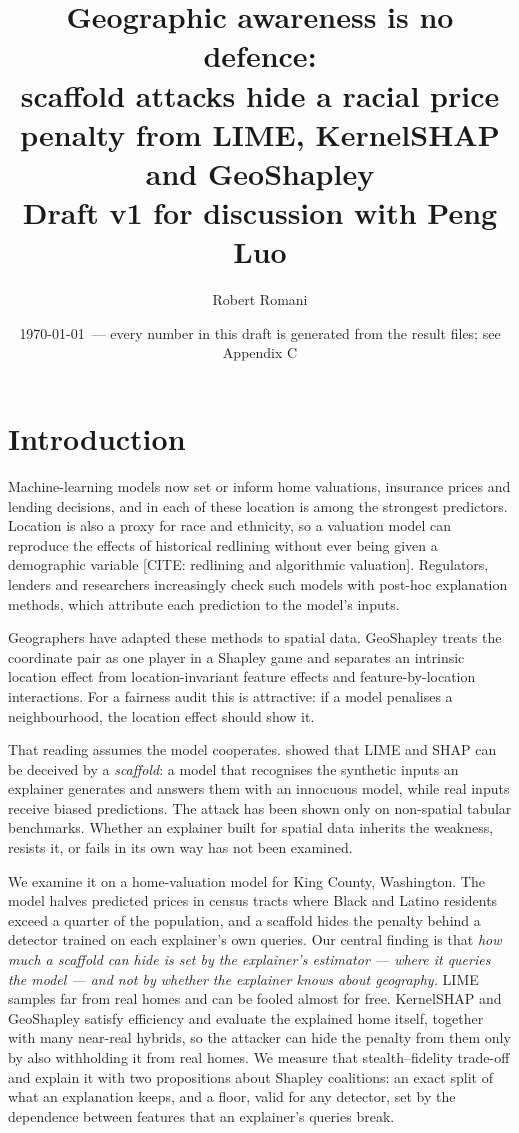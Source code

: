 \documentclass[11pt]{article}
\title{Geographic awareness is no defence:\\ scaffold attacks hide a racial price penalty from LIME, KernelSHAP and GeoShapley\\[6pt]
\large Draft v1 for discussion with Peng Luo}
\author{Robert Romani}
\date{\today\ --- every number in this draft is generated from the result files; see Appendix C}
\newcommand{\1}{\mathbf{1}}
\newcommand{\citeneeded}[1]{\textcolor{blue!60!black}{[CITE: #1]}}
\begin{document}
\maketitle

\begin{abstract}

\end{abstract}

\section{Introduction}

Machine-learning models now set or inform home valuations, insurance prices and lending decisions, and in each of
these location is among the strongest predictors. Location is also a proxy for race and ethnicity, so a valuation
model can reproduce the effects of historical redlining without ever being given a demographic variable
\citeneeded{redlining and algorithmic valuation}. Regulators, lenders and researchers increasingly check such models
with post-hoc explanation methods, which attribute each prediction to the model's inputs.

Geographers have adapted these methods to spatial data. GeoShapley \citep{li2024geoshapley} treats the coordinate
pair as one player in a Shapley game and separates an intrinsic location effect from location-invariant feature
effects and feature-by-location interactions. For a fairness audit this is attractive: if a model penalises a
neighbourhood, the location effect should show it.

That reading assumes the model cooperates. \citet{slack2020fooling} showed that LIME and SHAP can be deceived by a
\emph{scaffold}: a model that recognises the synthetic inputs an explainer generates and answers them with an
innocuous model, while real inputs receive biased predictions. The attack has been shown only on non-spatial tabular
benchmarks. Whether an explainer built for spatial data inherits the weakness, resists it, or fails in its own way
has not been examined.

We examine it on a home-valuation model for King County, Washington. The model halves predicted prices in census
tracts where Black and Latino residents exceed a quarter of the population, and a scaffold hides the penalty behind
a detector trained on each explainer's own queries. Our central finding is that \emph{how much a scaffold can hide is
set by the explainer's estimator --- where it queries the model --- and not by whether the explainer knows about
geography.} LIME samples far from real homes and can be fooled almost for free. KernelSHAP and GeoShapley satisfy
efficiency and evaluate the explained home itself, together with many near-real hybrids, so the attacker can hide
the penalty from them only by also withholding it from real homes. We measure that stealth--fidelity trade-off and
explain it with two propositions about Shapley coalitions: an exact split of what an explanation keeps, and a floor,
valid for any detector, set by the dependence between features that an explainer's queries break.
\end{document}
